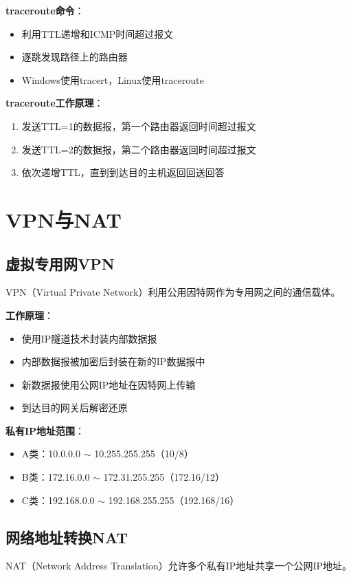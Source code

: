 \documentclass[12pt,a4paper,openany]{ctexbook}
\begin{document}
\textbf{traceroute命令}：
\begin{itemize}[leftmargin=2em,itemsep=0pt]
    \item 利用TTL递增和ICMP时间超过报文
    \item 逐跳发现路径上的路由器
    \item Windows使用tracert，Linux使用traceroute
\end{itemize}

\begin{tipbox}
\textbf{traceroute工作原理}：
\begin{enumerate}[itemsep=0pt]
    \item 发送TTL=1的数据报，第一个路由器返回时间超过报文
    \item 发送TTL=2的数据报，第二个路由器返回时间超过报文
    \item 依次递增TTL，直到到达目的主机返回回送回答
\end{enumerate}
\end{tipbox}

\section{VPN与NAT}
\subsection{虚拟专用网VPN}
VPN（Virtual Private Network）利用公用因特网作为专用网之间的通信载体。

\textbf{工作原理}：
\begin{itemize}[leftmargin=2em,itemsep=0pt]
    \item 使用IP隧道技术封装内部数据报
    \item 内部数据报被加密后封装在新的IP数据报中
    \item 新数据报使用公网IP地址在因特网上传输
    \item 到达目的网关后解密还原
\end{itemize}

\textbf{私有IP地址范围}：
\begin{itemize}[leftmargin=2em,itemsep=0pt]
    \item A类：10.0.0.0 $\sim$ 10.255.255.255（10/8）
    \item B类：172.16.0.0 $\sim$ 172.31.255.255（172.16/12）
    \item C类：192.168.0.0 $\sim$ 192.168.255.255（192.168/16）
\end{itemize}

\subsection{网络地址转换NAT}
NAT（Network Address Translation）允许多个私有IP地址共享一个公网IP地址。
\end{document}
